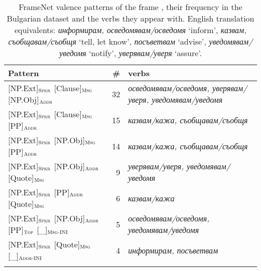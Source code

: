 \documentclass[output=paper,colorlinks,citecolor=brown]{langscibook}
\begin{document}
\begin{table}
    \centering\footnotesize
    \begin{tabularx}{\textwidth}{ lr Q}
\lsptoprule
         Pattern  & \#  & verbs \\
\midrule
{[NP.Ext]}$_{\text{\textsc{Spkr}}}$ {[Clause]}$_{\text{\textsc{Msg}}}$ {[NP.Obj]}$_{\text{\textsc{Addr}}}$ & 32 & \textit{осведомявам\slash осведомя, уверявам\slash уверя, уведомявам\slash уведомя}\\

{[NP.Ext]}$_{\text{\textsc{Spkr}}}$ {[Clause]}$_{\text{\textsc{Msg}}}$ {[PP]}$_{\text{\textsc{Addr}}}$ & 15 & \textit{казвам\slash кажа, съобщавам\slash съобщя}\\

{[NP.Ext]}$_{\text{\textsc{Spkr}}}$ {[NP.Obj]}$_{\text{\textsc{Msg}}}$ {[PP]}$_{\text{\textsc{Addr}}}$ & 14 & \textit{казвам\slash кажа, съобщавам\slash съобщя}\\

{[NP.Ext]}$_{\text{\textsc{Spkr}}}$ {[NP.Obj]}$_{\text{\textsc{Addr}}}$ {[Quote]}$_{\text{\textsc{Msg}}}$ & 9 & \textit{уверявам\slash уверя, уведомявам\slash уведомя}\\

{[NP.Ext]}$_{\text{\textsc{Spkr}}}$ {[PP]}$_{\text{\textsc{Addr}}}$ {[Quote]}$_{\text{\textsc{Msg}}}$ & 6 & \textit{казвам\slash кажа}\\

{[NP.Ext]}$_{\text{\textsc{Spkr}}}$ {[NP.Obj]}$_{\text{\textsc{Addr}}}$ {[PP]}$_{\text{\textsc{Top}}}$  {[\_]}$_{\text{\textsc{Msg-INI}}}$ & 5 & \textit{осведомявам\slash осведомя, уведомявам\slash уведомя}\\

{[NP.Ext]}$_{\text{\textsc{Spkr}}}$ {[Quote]}$_{\text{\textsc{Msg}}}$  {[\_]}$_{\text{\textsc{Addr-INI}}}$ & 4 & \textit{информирам, посъветвам}\\

\lspbottomrule
    \end{tabularx}
    \caption{FrameNet valence patterns of the frame , their frequency in the Bulgarian dataset and the verbs they appear with.
     English translation equivalents: \textit{информирам, осведомявам\slash осведомя} `inform', \textit{казвам, съобщавам\slash съобщя} `tell, let know', \textit{посъветвам} `advise', \textit{уведомявам\slash уведомя} `notify', \textit{уверявам\slash уверя} `assure'.}
    \label{tbl:telling-valence-bg}
\end{table} 
\end{document}
